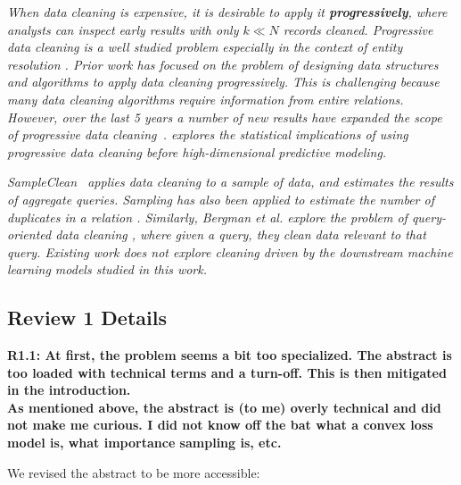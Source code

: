 \emph{When data cleaning is expensive, it is desirable to apply it \textbf{progressively}, where analysts can inspect early results with only $k \ll N$ records cleaned.
Progressive data cleaning is a well studied problem especially in the context of entity resolution \cite{altowim2014progressive, whang2014incremental, papenbrock2015progressive, gruenheid2014incremental}.
Prior work has focused on the problem of designing data structures and algorithms to apply data cleaning progressively.
This is challenging because many data cleaning algorithms require information from entire relations.
However, over the last 5 years a number of new results have expanded the scope of progressive data cleaning~\cite{mayfield2010eracer, DBLP:journals/pvldb/YakoutENOI11, yakout2013don}.
\sys explores the statistical implications of using progressive data cleaning before high-dimensional predictive modeling.}

\vspace{0.5em}

\emph{SampleClean~\cite{wang1999sample} applies data cleaning to a sample of data, and estimates the results of aggregate queries.
Sampling has also been applied to estimate the number of duplicates in a relation \cite{heise2014estimating}. 
Similarly, Bergman et al. explore the problem of query-oriented data cleaning \cite{DBLP:conf/sigmod/BergmanMNT15}, where given a query, they clean data relevant to that query. 
Existing work does not explore cleaning driven by the downstream machine learning models studied in this work.}

\subsection*{Review 1 Details} 

\noindent\textbf{R1.1: At first, the problem seems a bit too specialized. The abstract is too loaded with technical terms and a turn-off. This is then mitigated in the introduction. \\
As mentioned above, the abstract is (to me) overly technical and did not make me curious. I did not know off the bat what a convex loss model is, what importance sampling is, etc.}

\noindent We revised the abstract to be more accessible:

